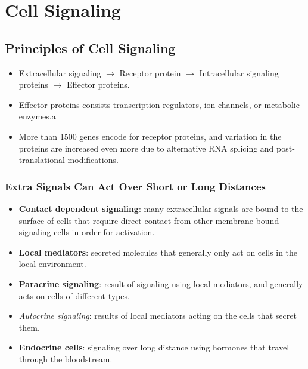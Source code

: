 \documentclass[12pt,a4paper]{article}
\begin{document}
\tableofcontents
\cleardoublepage
\fancyhead{}

\clearpage
\setcounter{section}{14}
\section{Cell Signaling}
\subsection{Principles of Cell Signaling}
\begin{itemize}
    \item Extracellular signaling \(\rightarrow\) Receptor protein \(\rightarrow\) Intracellular signaling proteins \(\rightarrow\) Effector proteins.
    \item Effector proteins consists transcription regulators, ion channels, or metabolic enzymes.a
    \item More than 1500 genes encode for receptor proteins, and variation in the proteins are increased even more due to alternative RNA splicing and post-translational modifications.
\end{itemize}

\subsubsection{Extra Signals Can Act Over Short or Long Distances}
\begin{itemize}
    \item \textbf{Contact dependent signaling}: many extracellular signals are bound to the surface of cells that require direct contact from other membrane bound signaling cells in order for activation.
    \item \textbf{Local mediators}: secreted molecules that generally only act on cells in the local environment.
    \item \textbf{Paracrine signaling}: result of signaling using local mediators, and generally acts on cells of different types.
    \item \textit{Autocrine signaling}: results of local mediators acting on the cells that secret them.
    \item \textbf{Endocrine cells}: signaling over long distance using hormones that travel through the bloodstream. 
\end{itemize}
\end{document}
